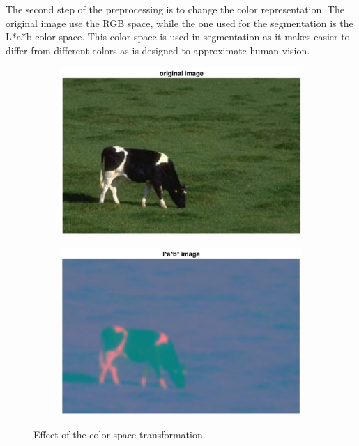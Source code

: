 \documentclass{ethz_report}
\begin{document}
The second step of the preprocessing is to change the color representation.
The original image use the RGB space, while the one used for the segmentation is the L*a*b color space.
This color space is used in segmentation as it makes easier to differ from different colors as is designed to approximate human vision.

\begin{figure}[h]
    \centering
    \begin{subfigure}[b]{.5\textwidth}
        \centering
        \includegraphics[width=1\linewidth]{images/original}
    \end{subfigure}%
    \begin{subfigure}[b]{.5\textwidth}
        \centering
        \includegraphics[width=1\linewidth]{images/img_Lab}
    \end{subfigure}
    \caption{Effect of the color space transformation.}
    \label{fig:color_transform}
\end{figure}
\end{document}
